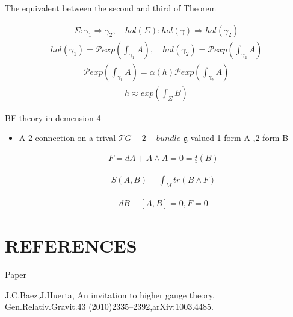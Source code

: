 \documentclass[12pt,aspectratio=53,mathserif]{beamer}
\begin{document}
\begin{frame}
    {The equivalent between the second and third of Theorem }
    \begin{enumerate}
        \begin{align}
            \Sigma:\gamma_1 \Longrightarrow \gamma_2,\quad
            hol(\Sigma):hol(\gamma)\Longrightarrow hol(\gamma_2)
        \end{align}
        \begin{align}
            hol(\gamma_1)=\mathcal{P}exp(\int_{\gamma_1} A), \quad
            hol(\gamma_2)=\mathcal{P}exp(\int_{\gamma_2} A)
        \end{align}
        \begin{align}
            \mathcal{P}exp(\int_{\gamma_1} A)=\alpha(h)
           \mathcal{P}exp(\int_{\gamma_2} A)
        \end{align}
        \begin{align}
           h \approx exp(\int_{\Sigma} B)
        \end{align}
      
      
\end{enumerate}
\end{frame}


\begin{frame}
    {BF theory in demension 4}
    \begin{itemize}
        \item A 2-connection on a trival $\mathcal{T}G-2-bundle$ $\mathfrak{g}$-valued 1-form A ,2-form B
        
        \begin{align}
         F=dA+A \wedge A=0=\underline{t} (B)
        \end{align}
   
     \begin{align}
       S(A,B)=\int_{M} tr(B \wedge F)
    \end{align}

 \begin{align}
  dB+[A,B]=0,F=0
\end{align}
\end{itemize}
\end{frame}





	 \section{REFERENCES }
	\begin{frame}{Paper}
			\begin{spacing}{2.0}
		J.C.Baez,J.Huerta, An invitation to higher gauge theory, \\
        Gen.Relativ.Gravit.43 (2010)2335–2392,arXiv:1003.4485.
       
	
	
\end{spacing}
	\end{frame}
	
\end{document}
